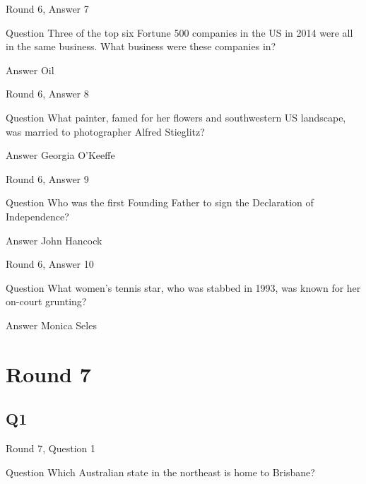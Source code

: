 \documentclass[11pt]{beamer}
\begin{document}
\begin{frame}[t]{Round 6, Answer 7}
\vspace{2em}
\begin{block}{Question}
Three of the top six Fortune 500 companies in the US in 2014 were all in the same business. What business were these companies in\@?
\end{block}
\pause{}
\begin{block}{Answer}
Oil
\end{block}
\end{frame}
    

\begin{frame}[t]{Round 6, Answer 8}
\vspace{2em}
\begin{block}{Question}
What painter, famed for her flowers and southwestern US landscape, was married to photographer Alfred Stieglitz\@?
\end{block}
\pause{}
\begin{block}{Answer}
Georgia O'Keeffe
\end{block}
\end{frame}
    

\begin{frame}[t]{Round 6, Answer 9}
\vspace{2em}
\begin{block}{Question}
Who was the first Founding Father to sign the Declaration of Independence\@?
\end{block}
\pause{}
\begin{block}{Answer}
John Hancock
\end{block}
\end{frame}
    

\begin{frame}[t]{Round 6, Answer 10}
\vspace{2em}
\begin{block}{Question}
What women's tennis star, who was stabbed in 1993, was known for her on-court grunting\@?
\end{block}
\pause{}
\begin{block}{Answer}
Monica Seles
\end{block}
\end{frame}
    

\section{Round 7}
    

\subsection*{Q1}
\begin{frame}[t]{Round 7, Question 1}
\vspace{2em}
\begin{block}{Question}
Which Australian state in the northeast is home to Brisbane\@?
\end{block}
\end{frame}
    
\end{document}
